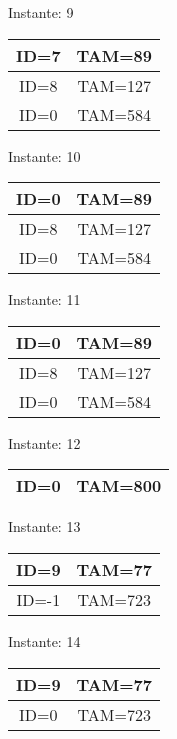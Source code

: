 \documentclass[10pt,a4paper]{article}
\begin{document}
\pagebreak
\begin{center}

Instante: 9

\begin{tabular}{|c|c|}
\hline
ID=7 & TAM=89 \\ \hline
ID=8 & TAM=127 \\ \hline
ID=0 & TAM=584 \\ \hline
\end{tabular}
\end{center}
\pagebreak
\begin{center}

Instante: 10

\begin{tabular}{|c|c|}
\hline
ID=0 & TAM=89 \\ \hline
ID=8 & TAM=127 \\ \hline
ID=0 & TAM=584 \\ \hline
\end{tabular}
\end{center}
\pagebreak
\begin{center}

Instante: 11

\begin{tabular}{|c|c|}
\hline
ID=0 & TAM=89 \\ \hline
ID=8 & TAM=127 \\ \hline
ID=0 & TAM=584 \\ \hline
\end{tabular}
\end{center}
\pagebreak
\begin{center}

Instante: 12

\begin{tabular}{|c|c|}
\hline
ID=0 & TAM=800 \\ \hline
\end{tabular}
\end{center}
\pagebreak
\begin{center}

Instante: 13

\begin{tabular}{|c|c|}
\hline
ID=9 & TAM=77 \\ \hline
ID=-1 & TAM=723 \\ \hline
\end{tabular}
\end{center}
\pagebreak
\begin{center}

Instante: 14

\begin{tabular}{|c|c|}
\hline
ID=9 & TAM=77 \\ \hline
ID=0 & TAM=723 \\ \hline
\end{tabular}
\end{center}
\end{document}
